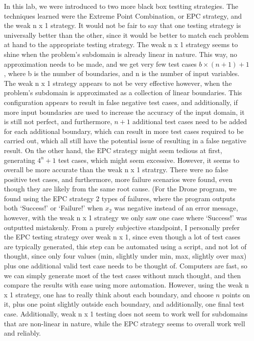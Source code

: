 In this lab, we were introduced to two more black box testting strategies. The
techniques learned were the Extreme Point Combination, or EPC strategy, and the
weak n x 1 strategy. It would not be fair to say that one testing strategy
is universally better than the other, since it would be better to match
each problem at hand to the appropriate testing strategy. The weak n x 1
strategy seems to shine when the problem's subdomain is already linear in
nature. This way, no approximation needs to be made, and we get very few
test cases $b \times (n + 1) + 1$, where b is the number of boundaries, and
n is the number of input variables. The weak n x 1 strategy appears to not
be very effective however, when the problem's subdomain is approximated as
a collection of linear boundaries. This configuration appears to result in
false negative test cases, and additionally, if more input boundaries are
used to increase the accuracy of the input domain, it is still not perfect,
and furthermore, $n + 1$ additional test cases need to be added for each
additional boundary, which can result in more test cases required to be carried
out, which all still have the potential issue of resulting in a false
negative result. On the other hand, the EPC strategy might seem tedious
at first, generating $4^n + 1$ test cases, which might seem excessive.
However, it seems to overall be more accurate than the weak n x 1 stratrgy.
There were no false positive test cases, and furthermore, more failure
scenarios were found, even though they are likely from the same root cause.
(For the Drone program, we found using the EPC strategy 2 types of failures,
where the program outputs both `Success!'                       
or `Failure!' when $x_2$ was negative instead of an error message, however,
with the weak n x 1 strategy we only saw one case where
`Success!' was outputted mistakenly. From a purely subjective standpoint,
I personally prefer the EPC testing strategy over weak n x 1, since
even though a lot of test cases are typically generated, this step can be
automated using a script, and not lot of thought, since only four values
(min, slightly under min, max, slightly over max) plus one additional
valid test case needs to be thought of. Computers are fast, so we can simply
generate most of the test cases without much thought, and then compare the
results with ease using more automation. However, using the weak n x 1
strategy, one has to really think about each boundary, and choose $n$ points on
it, plus one point slightly outside each boundary, and additionally, one final
test case. Additionally, weak n x 1 testing does not seem to work well for
subdomains that are non-linear in nature, while the EPC strategy seems to
overall work well and reliably.

